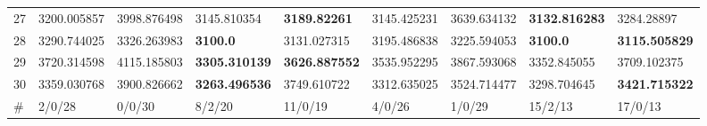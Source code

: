 \begin{table*}[t]
\begin{tabular}{|p{0.8cm}|p{1.6cm}|p{1.6cm}|p{1.6cm}|p{1.6cm}|p{1.6cm}|p{1.6cm}|p{1.6cm}|p{1.6cm}|}
27  & 3200.005857 & 3998.876498 & 3145.810354 & \textbf{3189.82261} & 3145.425231 & 3639.634132 & \textbf{3132.816283} & 3284.28897 \\ 
28  & 3290.744025 & 3326.263983 & \textbf{3100.0} & 3131.027315 & 3195.486838 & 3225.594053 & \textbf{3100.0} & \textbf{3115.505829} \\ 
29  & 3720.314598 & 4115.185803 & \textbf{3305.310139} & \textbf{3626.887552} & 3535.952295 & 3867.593068 & 3352.845055 & 3709.102375 \\ 
30  & 3359.030768 & 3900.826662 & \textbf{3263.496536} & 3749.610722 & 3312.635025 & 3524.714477 & 3298.704645 & \textbf{3421.715322} \\ 
\hline
\#  & 2/0/28 & 0/0/30 & 8/2/20 & 11/0/19 & 4/0/26 & 1/0/29 & 15/2/13 & 17/0/13 \\
\hline
\end{tabular}
\end{table*}
\endgroup

